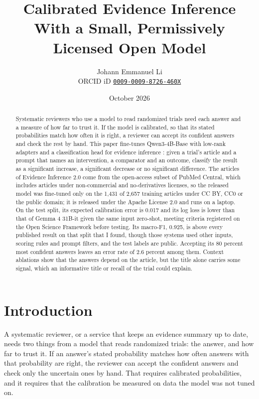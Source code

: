 \documentclass[11pt,letterpaper]{article}
\title{Calibrated Evidence Inference With a Small, Permissively Licensed Open Model}
\author{Johann Emmanuel Li\\[2pt]
\small ORCID iD \href{https://orcid.org/0009-0009-8726-460X}{\nolinkurl{0009-0009-8726-460X}}}
\date{October 2026}
\begin{document}
\maketitle

\begin{abstract}
\noindent Systematic reviewers who use a model to read randomized trials need each answer and a measure of how far to trust it. If the model is calibrated, so that its stated probabilities match how often it is right, a reviewer can accept its confident answers and check the rest by hand. This paper fine-tunes Qwen3-4B-Base with low-rank adapters and a classification head for evidence inference \citep{lehman2019,deyoung2020}: given a trial's article and a prompt that names an intervention, a comparator and an outcome, classify the result as a significant increase, a significant decrease or no significant difference. The articles of Evidence Inference 2.0 come from the open-access subset of PubMed Central, which includes articles under non-commercial and no-derivatives licenses, so the released model was fine-tuned only on the 1,431 of 2,657 training articles under CC BY, CC0 or the public domain; it is released under the Apache License 2.0 and runs on a laptop. On the test split, its expected calibration error is 0.017 and its log loss is lower than that of Gemma 4 31B-it given the same input zero-shot, meeting criteria registered on the Open Science Framework before testing. Its macro-F1, 0.925, is above every published result on that split that I found, though those systems used other inputs, scoring rules and prompt filters, and the test labels are public. Accepting its 80 percent most confident answers leaves an error rate of 2.6 percent among them. Context ablations show that the answers depend on the article, but the title alone carries some signal, which an informative title or recall of the trial could explain.
\end{abstract}

\section{Introduction}
\label{sec:intro}

A systematic reviewer, or a service that keeps an evidence summary up to date, needs two things from a model that reads randomized trials: the answer, and how far to trust it. If an answer's stated probability matches how often answers with that probability are right, the reviewer can accept the confident answers and check only the uncertain ones by hand. That requires calibrated probabilities, and it requires that the calibration be measured on data the model was not tuned on.
\end{document}
